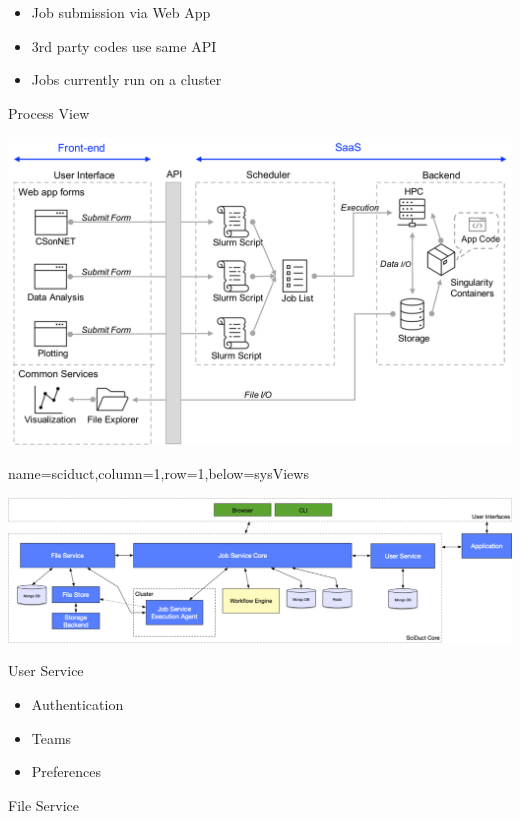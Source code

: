 \documentclass[landscape,paperwidth=70in,paperheight=46in,fontscale=0.225]{baposter} %
\begin{document}
\begin{poster}
{\begin{minipage}{.29\textwidth}
\begin{itemize}[leftmargin=*,noitemsep,topsep=0pt]
\item Job submission via Web App
\item 3rd party codes use same API
\item Jobs currently run on a cluster
\end{itemize}
\end{minipage}
\hfill
\begin{minipage}{.71\textwidth}
\vspace{5mm}
\begin{center}
Process View
\end{center}
\includegraphics[scale=0.2]{figures/netsci_ops_v6.pdf}
\end{minipage}

}

          {name=sciduct,column=1,row=1,below=sysViews}{
          
\includegraphics[scale=0.27]{figures/sciduct.png}

\vspace{5mm}
\noindent 
\begin{minipage}[t]{0.32\columnwidth}
User Service

\small{\begin{itemize}[leftmargin=*,noitemsep,topsep=0pt]
	\item Authentication
	\item Teams
	\item Preferences
\end{itemize}}
\end{minipage}
\hfill
\noindent
\begin{minipage}[t]{0.32\columnwidth}
File Service


\end{minipage}}
\end{poster}
\end{document}
